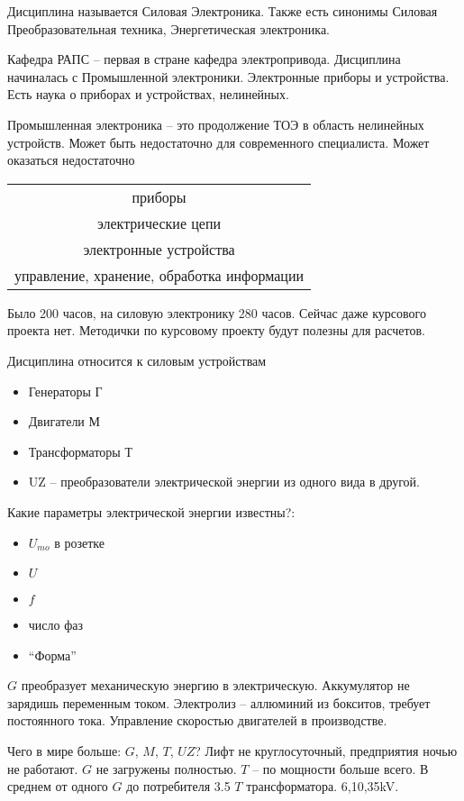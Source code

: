 Дисциплина называется Силовая Электроника. Также есть синонимы
Силовая Преобразовательная техника, Энергетическая электроника.

Кафедра РАПС -- первая в стране кафедра электропривода.
Дисциплина начиналась с Промышленной электроники. Электронные приборы и
устройства. Есть наука о приборах и устройствах, нелинейных.

Промышленная электроника -- это продолжение ТОЭ в область нелинейных
устройств.
Может быть недостаточно для современного специалиста. Может оказаться
недостаточно

\begin{tabular}{c}
  приборы\\
  электрические цепи\\
  электронные устройства\\
  управление, хранение, обработка информации
\end{tabular}

Было 200 часов, на силовую электронику 280 часов. Сейчас даже курсового
проекта нет. Методички по курсовому проекту будут полезны для расчетов.

Дисциплина относится к силовым устройствам
\begin{itemize}
\item Генераторы Г
\item Двигатели М
\item Трансформаторы Т
\item UZ -- преобразователи электрической энергии из одного вида в другой.
\end{itemize}

Какие параметры электрической энергии известны?:
\begin{itemize}
\item $U_{mo}$ в розетке
\item $U$
\item $f$
\item число фаз
\item ``Форма''  
\end{itemize}  
  
$G$ преобразует механическую энергию в электрическую.
Аккумулятор не зарядишь переменным током. Электролиз -- аллюминий из бокситов,
требует постоянного тока.
Управление скоростью двигателей в производстве.

Чего в мире больше: $G$, $M$, $T$, $UZ$?
Лифт не круглосуточный, предприятия ночью не работают. $G$ не загружены
полностью. $T$ -- по мощности больше всего. В среднем от одного $G$ до
потребителя 3.5 $T$ трансформатора. 6,10,35kV.

